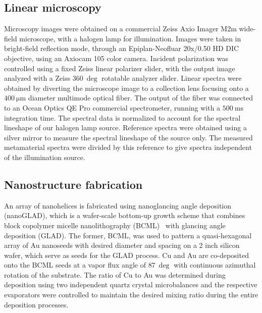 \subsection{Linear microscopy}
Microscopy images were obtained on a commercial Zeiss Axio Imager M2m wide-field microscope, with a halogen lamp for illumination. Images were taken in bright-field reflection mode, through an Epiplan-Neofluar 20x/0.50 HD DIC objective, using an Axiocam 105 color camera. Incident polarization was controlled using a fixed Zeiss linear polarizer slider, with the output image analyzed with a Zeiss $\SI{360}{\deg}$ rotatable analyzer slider. Linear spectra were obtained by diverting the microscope image to a collection lens focusing onto a $\SI{400}{\micro\m}$ diameter multimode optical fiber. The output of the fiber was connected to an Ocean Optics QE Pro commercial spectrometer, running with a $\SI{500}{\milli\s}$ integration time. The spectral data is normalized to account for the spectral lineshape of our halogen lamp source. Reference spectra were obtained using a silver mirror to measure the spectral lineshape of the source only. The measured metamaterial spectra were divided by this reference to give spectra independent of the illumination source.

\subsection{Nanostructure fabrication}
An array of nanohelices is fabricated using nanoglancing angle deposition (nanoGLAD), which is a wafer-scale bottom-up growth scheme that combines block copolymer micelle nanolithography (BCML)~\cite{Glass2003} with glancing angle deposition (GLAD).\cite{Mark2013} 
The former, BCML, was used to pattern a quasi-hexagonal array of Au nanoseeds with desired diameter and spacing on a 2 inch silicon wafer, which serve as seeds for the GLAD process. Cu and Au are co-deposited onto the BCML seeds at a vapor flux angle of $\SI{87}{\deg}$ with continuous azimuthal rotation of the substrate. The ratio of Cu to Au was determined during deposition using two independent quartz crystal microbalances and the respective evaporators were controlled to maintain the desired mixing ratio during the entire deposition processes.